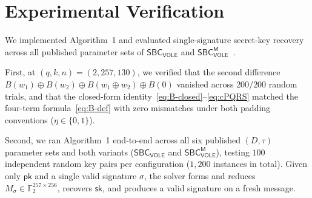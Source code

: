 \documentclass[11pt,a4paper]{article}
\theoremstyle{definition}
\theoremstyle{remark}
\newcommand{\Ftwo}{\mathbb{F}_2}
\newcommand{\SBCVOLE}{\mathsf{SBC}_{\mathsf{VOLE}}}
\newcommand{\SBCVOLEM}{\mathsf{SBC}_{\mathsf{VOLE}}^{\mathsf{M}}}
\newcommand{\pk}{\mathsf{pk}}
\newcommand{\sk}{\mathsf{sk}}
\begin{document}
\section{Experimental Verification}
\label{sec:experiments}

We implemented Algorithm~1 and evaluated single-signature secret-key recovery across all published parameter sets of $\SBCVOLE$ and $\SBCVOLEM$~\cite{HJ25}.

First, at $(q, k, n) = (2, 257, 130)$, we verified that the second difference $B(w_1) \oplus B(w_2) \oplus B(w_1 \oplus w_2) \oplus B(0)$ vanished across $200 / 200$ random trials, and that the closed-form identity~\eqref{eq:B-closed}--\eqref{eq:cPQRS} matched the four-term formula~\eqref{eq:B-def} with zero mismatches under both padding conventions ($\eta \in \{0, 1\}$).

Second, we ran Algorithm~1 end-to-end across all six published $(D, \tau)$ parameter sets and both variants ($\SBCVOLE$ and $\SBCVOLEM$), testing $100$ independent random key pairs per configuration ($1{,}200$ instances in total). Given only $\pk$ and a single valid signature $\sigma$, the solver forms and reduces $M_\sigma \in \Ftwo^{257 \times 256}$, recovers $\sk$, and produces a valid signature on a fresh message.
\end{document}

